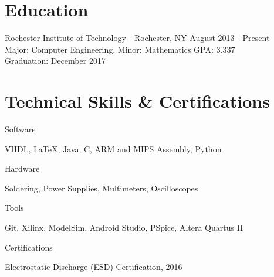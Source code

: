 \documentclass[a4paper,margin,line]{resume}
\newcommand{\rdate}[1]{\hfill {\small #1}}
\begin{document}
\begin{resume}
\section{\mysidestyle Education}
	\begin{compactdesc}
		\item[Rochester Institute of Technology] - Rochester, NY \rdate{August 2013 - Present} \\
            Major: Computer Engineering, Minor: Mathematics \rdate{GPA: 3.337} \\
            Graduation: December 2017
	\end{compactdesc}

\section{\mysidestyle Technical Skills \& Certifications}
    \begin{compactdesc}
		\item[Software] \begin{inparaenum} { \small
            VHDL,
            \LaTeX,
			Java,
			C,
            ARM and MIPS Assembly,
            Python
		} \end{inparaenum}
		\item[Hardware] \begin{inparaenum} { \small
			Soldering,
            Power Supplies,
            Multimeters,
            Oscilloscopes
		} \end{inparaenum}
        \item[Tools] \begin{inparaenum} { \small
            Git,
            Xilinx,
            ModelSim,
            Android Studio,
            PSpice,
            Altera Quartus II
        } \end{inparaenum}
        \item[Certifications] \begin{inparaenum} { \small
            Electrostatic Discharge (ESD) Certification, 2016   
        } \end{inparaenum}
	\end{compactdesc}


\end{resume}
\end{document}
